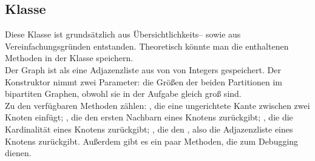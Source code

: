 \subsection{Klasse }
Diese Klasse ist grundsätzlich aus Übersichtlichkeits--  sowie aus Vereinfachungsgründen
entstanden. Theoretisch könnte man die enthaltenen Methoden in der Klasse  
speichern.\\

Der Graph ist als eine Adjazenzliste aus  von  von Integers gespeichert.
Der Konstruktor nimmt zwei Parameter: die Größen der beiden Partitionen
im bipartiten Graphen, obwohl sie in der Aufgabe gleich groß sind.\\

Zu den verfügbaren Methoden zählen: ,
die eine ungerichtete Kante zwischen zwei Knoten einfügt; , die den ersten Nachbarn eines Knotens zurückgibt; , die die Kardinalität
eines Knotens zurückgibt; , die den , also die Adjazenzliste
eines Knotens zurückgibt. Außerdem gibt es ein paar Methoden, die zum Debugging dienen. 
